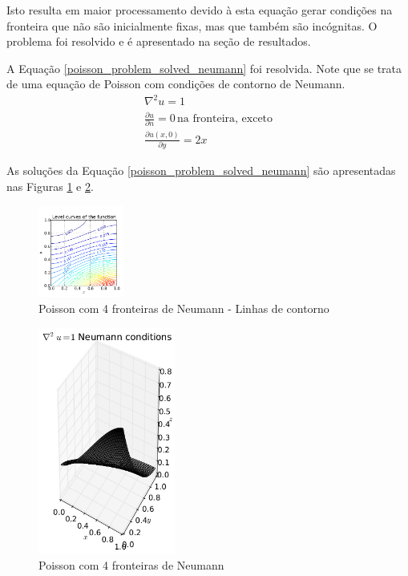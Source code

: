 \documentclass[journal]{IEEEtran}
\begin{document}
Isto resulta em maior processamento devido à esta equação gerar condições na fronteira que não são inicialmente fixas, mas que também são incógnitas. O problema foi resolvido e é apresentado na seção de resultados.

A Equação \ref{poisson_problem_solved_neumann} foi resolvida. Note que se trata de uma equação de Poisson com condições de contorno de Neumann.
\begin{eqnarray}
\nabla^2 u = 1 \label{poisson_problem_solved_neumann}\\
\frac{\partial u}{\partial n}=0\,\textrm{na fronteira, exceto}\\
\frac{\partial u(x,0)}{\partial y}=2x
\end{eqnarray}

As soluções da Equação \ref{poisson_problem_solved_neumann} são apresentadas nas Figuras \ref{poisson_neumann_contorno} e \ref{poisson_neumann}.
\begin{figure}[ht!]
\centering
\includegraphics[width = 0.25\textwidth]{figures/poisson_neumann_02.png}
\caption{Poisson com 4 fronteiras de Neumann - Linhas de contorno\label{poisson_neumann_contorno}}
\end{figure}

\begin{figure}[ht!]
\centering
\includegraphics[width = 0.4\textwidth]{figures/poisson_neumann_01.png}
\caption{Poisson com 4 fronteiras de Neumann\label{poisson_neumann}}
\end{figure}
\end{document}

